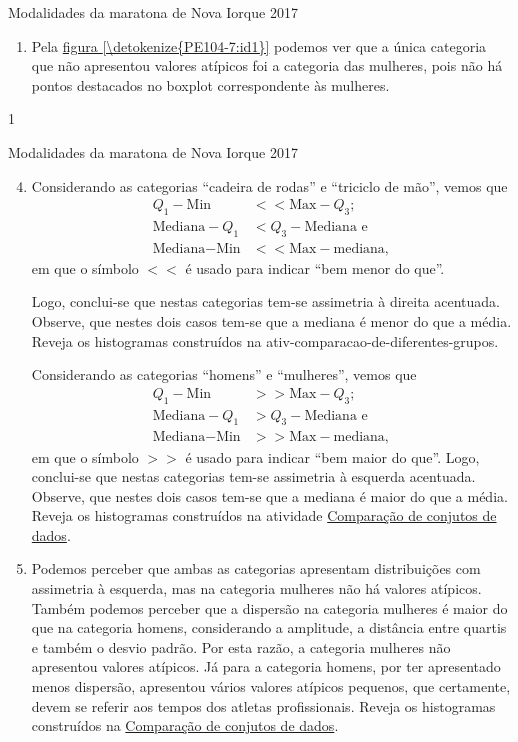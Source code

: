 {{{\begin{answer}{Modalidades da maratona de Nova Iorque 2017}
{\begin{enumerate}
\item Pela \hyperref[\detokenize{PE104-7:id1}]{figura \ref{\detokenize{PE104-7:id1}}} podemos ver que a única categoria que não apresentou valores atípicos foi a categoria das mulheres, pois não há pontos destacados no boxplot correspondente às mulheres.
\end{enumerate}
}{1}
\end{answer}
\begin{answer}{Modalidades da maratona de Nova Iorque 2017}
{
\begin{enumerate}\setcounter{enumi}{3}
\item Considerando as categorias “cadeira de rodas”{} e “triciclo de mão”, vemos que
\begin{align*}
Q_1-\text{Min}&<<\text{Max}-Q_3;\\
\text{Mediana}-Q_1&<Q_3-\text{Mediana e}\\ 
\text{Mediana}-\text{Min}&<<\text{Max}-\text{mediana},
\end{align*}
em que o símbolo $<<$ é usado para indicar “bem menor do que”.

Logo, conclui-se que nestas categorias tem-se assimetria à direita acentuada. Observe, que nestes dois casos tem-se que a mediana é menor do que a média. Reveja os histogramas construídos na ativ-comparacao-de-diferentes-grupos.

Considerando as categorias “homens”{} e “mulheres”, vemos que
\begin{align*}
Q_1-\text{Min}&>>\text{Max}-Q_3;\\
\text{Mediana}-Q_1&>Q_3-\text{Mediana e}\\ 
\text{Mediana}-\text{Min}&>>\text{Max}-\text{mediana},
\end{align*}
em que o símbolo $>>$ é usado para indicar “bem maior do que”. Logo, conclui-se que nestas categorias tem-se assimetria à esquerda acentuada. Observe, que nestes dois casos tem-se que a mediana é maior do que a média. Reveja os histogramas construídos na atividade \hyperref[\detokenize{PE104-5:ativ-compara-categorias}]{Comparação de conjutos de dados}.

\item Podemos perceber que ambas as categorias apresentam distribuições com assimetria à esquerda, mas na categoria mulheres não há valores atípicos. Também podemos perceber que a dispersão na categoria mulheres é maior do que na categoria homens, considerando a amplitude, a distância entre quartis e também o desvio padrão. Por esta razão, a categoria mulheres não apresentou valores atípicos. Já para a categoria homens, por ter apresentado menos dispersão, apresentou vários valores atípicos pequenos, que certamente, devem se referir aos tempos dos atletas profissionais. Reveja os histogramas construídos na \hyperref[\detokenize{PE104-5:ativ-compara-categorias}]{Comparação de conjutos de dados}.


\end{enumerate}}
\end{answer}}}}
